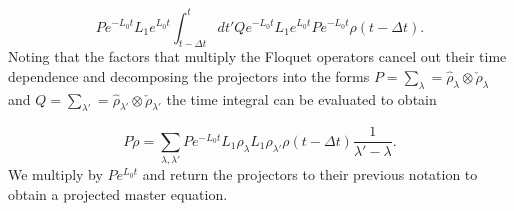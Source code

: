 \documentclass[reprint, amsmath,amssymb, aps,pra]{revtex4-1}
\begin{document}
\begin{equation}\label{ProyectionEQ}
P e^{-L_0 t}L_1e^{L_0 t}\int_{t-\Delta t}^{t}dt'Qe^{-L_0 t}L_1e^{L_0 t}Pe^{-L_0 t}\rho(t-\Delta t).
\end{equation} Noting that the factors that multiply the Floquet operators cancel out their time dependence and decomposing the projectors into the forms $P=\sum_\lambda = \hat{\rho}_\lambda \otimes \check{\rho}_\lambda$ and $Q=\sum_{\lambda'} = \hat{\rho}_{\lambda'} \otimes \check{\rho}_{\lambda'}$ the time integral can be evaluated to obtain

\begin{equation}
P\dot{\rho}=\sum_{\lambda ,\lambda'} P e^{-L_0 t} L_1 \rho_{\lambda} L_1 \rho_{\lambda'} \rho(t-\Delta t)\frac{1}{\lambda' - \lambda} .
\end{equation} We multiply by $Pe^{L_0 t}$ and return the projectors to their previous notation to obtain a projected master equation.





\end{document}

